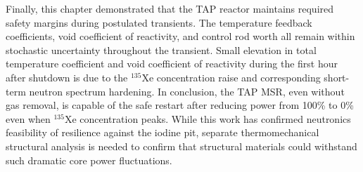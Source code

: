 Finally, this chapter demonstrated that the \gls{TAP} reactor maintains 
required safety margins during postulated transients. The temperature feedback 
coefficients, void coefficient of reactivity, and control rod worth all remain 
within stochastic uncertainty throughout the transient. Small elevation in 
total temperature coefficient and void coefficient of reactivity during the 
first hour after shutdown is due to the $^{135}$Xe concentration raise and 
corresponding short-term neutron spectrum hardening. In conclusion, the 
\gls{TAP} \gls{MSR}, even without gas removal, is capable of the safe restart 
after reducing power from 100\% to 0\% even when $^{135}$Xe concentration 
peaks. 
While this work has confirmed neutronics feasibility of resilience against the 
iodine pit, separate thermomechanical structural analysis is needed to confirm 
that structural materials could withstand such dramatic core power 
fluctuations.





